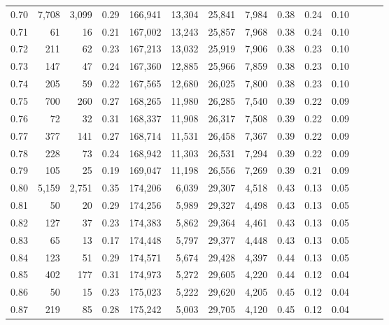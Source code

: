 \begin{tabular}{rrrrrrrrrrrrrr}
0.70 &   7,708 &  3,099 &  0.29 &  166,941 &   13,304 &  25,841 &   7,984 &  0.38 &  0.24 &      0.10 \\
0.71 &      61 &     16 &  0.21 &  167,002 &   13,243 &  25,857 &   7,968 &  0.38 &  0.24 &      0.10 \\
0.72 &     211 &     62 &  0.23 &  167,213 &   13,032 &  25,919 &   7,906 &  0.38 &  0.23 &      0.10 \\
0.73 &     147 &     47 &  0.24 &  167,360 &   12,885 &  25,966 &   7,859 &  0.38 &  0.23 &      0.10 \\
0.74 &     205 &     59 &  0.22 &  167,565 &   12,680 &  26,025 &   7,800 &  0.38 &  0.23 &      0.10 \\
0.75 &     700 &    260 &  0.27 &  168,265 &   11,980 &  26,285 &   7,540 &  0.39 &  0.22 &      0.09 \\
0.76 &      72 &     32 &  0.31 &  168,337 &   11,908 &  26,317 &   7,508 &  0.39 &  0.22 &      0.09 \\
0.77 &     377 &    141 &  0.27 &  168,714 &   11,531 &  26,458 &   7,367 &  0.39 &  0.22 &      0.09 \\
0.78 &     228 &     73 &  0.24 &  168,942 &   11,303 &  26,531 &   7,294 &  0.39 &  0.22 &      0.09 \\
0.79 &     105 &     25 &  0.19 &  169,047 &   11,198 &  26,556 &   7,269 &  0.39 &  0.21 &      0.09 \\
0.80 &   5,159 &  2,751 &  0.35 &  174,206 &    6,039 &  29,307 &   4,518 &  0.43 &  0.13 &      0.05 \\
0.81 &      50 &     20 &  0.29 &  174,256 &    5,989 &  29,327 &   4,498 &  0.43 &  0.13 &      0.05 \\
0.82 &     127 &     37 &  0.23 &  174,383 &    5,862 &  29,364 &   4,461 &  0.43 &  0.13 &      0.05 \\
0.83 &      65 &     13 &  0.17 &  174,448 &    5,797 &  29,377 &   4,448 &  0.43 &  0.13 &      0.05 \\
0.84 &     123 &     51 &  0.29 &  174,571 &    5,674 &  29,428 &   4,397 &  0.44 &  0.13 &      0.05 \\
0.85 &     402 &    177 &  0.31 &  174,973 &    5,272 &  29,605 &   4,220 &  0.44 &  0.12 &      0.04 \\
0.86 &      50 &     15 &  0.23 &  175,023 &    5,222 &  29,620 &   4,205 &  0.45 &  0.12 &      0.04 \\
0.87 &     219 &     85 &  0.28 &  175,242 &    5,003 &  29,705 &   4,120 &  0.45 &  0.12 &      0.04 \\

\end{tabular}
